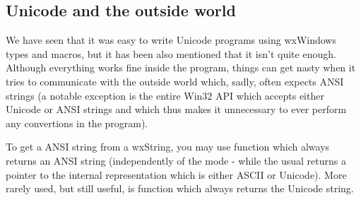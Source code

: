 \subsection{Unicode and the outside world}

We have seen that it was easy to write Unicode programs using wxWindows types
and macros, but it has been also mentioned that it isn't quite enough.
Although everything works fine inside the program, things can get nasty when
it tries to communicate with the outside world which, sadly, often expects
ANSI strings (a notable exception is the entire Win32 API which accepts either
Unicode or ANSI strings and which thus makes it unnecessary to ever perform
any convertions in the program).

To get a ANSI string from a wxString, you may use 
 function which always returns an ANSI
string (independently of the mode - while the usual 
 returns a pointer to the internal
representation which is either ASCII or Unicode). More rarely used, but still
useful, is  function which always returns
the Unicode string.

